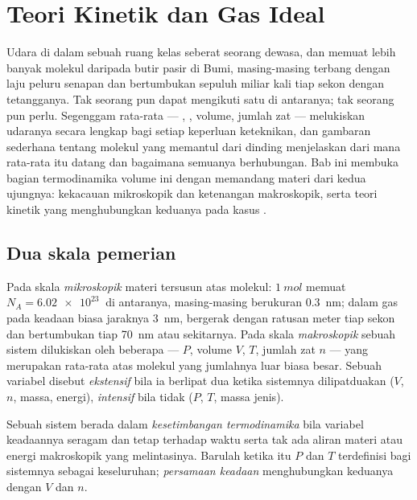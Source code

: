 \chapter{Teori Kinetik dan Gas Ideal}\label{ch:b1:kinetic-theory}

Udara di dalam sebuah ruang kelas seberat seorang dewasa, dan memuat lebih
banyak molekul daripada butir pasir di Bumi, masing-masing terbang dengan
laju peluru senapan dan bertumbukan sepuluh miliar kali tiap sekon dengan
tetangganya. Tak seorang pun dapat mengikuti satu di antaranya; tak seorang
pun perlu. Segenggam rata-rata --- , , volume, jumlah zat ---
melukiskan udaranya secara lengkap bagi setiap keperluan keteknikan, dan
gambaran sederhana tentang molekul yang memantul dari dinding menjelaskan
dari mana rata-rata itu datang dan bagaimana semuanya berhubungan. Bab ini
membuka bagian termodinamika volume ini dengan memandang materi dari kedua
ujungnya: kekacauan mikroskopik dan ketenangan makroskopik, serta teori
kinetik yang menghubungkan keduanya pada kasus .

\section{Dua skala pemerian}

\begin{definition}\label{def:b1:kinetic-theory:scales}
Pada skala \emph{mikroskopik} materi tersusun atas molekul: $\qty{1}{mol}$
memuat $N_A = \qty{6.02e23}{}$ di antaranya, masing-masing berukuran \qty{0.3}{nm};
dalam gas pada keadaan biasa jaraknya \qty{3}{nm}, bergerak dengan
ratusan meter tiap sekon dan bertumbukan tiap \qty{70}{nm} atau sekitarnya.
Pada skala \emph{makroskopik} sebuah sistem dilukiskan oleh beberapa
\emph{} ---  $P$, volume $V$,  $T$,
jumlah zat $n$ --- yang merupakan rata-rata atas molekul yang jumlahnya
luar biasa besar. Sebuah variabel disebut \emph{ekstensif} bila ia berlipat dua ketika sistemnya
dilipatduakan ($V$, $n$, massa, energi), \emph{intensif} bila tidak
($P$, $T$, massa jenis).
\end{definition}

\begin{definition}\label{def:b1:kinetic-theory:equilibrium}
Sebuah sistem berada dalam \emph{kesetimbangan termodinamika} bila variabel keadaannya
seragam dan tetap terhadap waktu serta tak ada aliran materi atau
energi makroskopik yang melintasinya. Barulah ketika itu $P$ dan $T$ terdefinisi bagi sistemnya
sebagai keseluruhan; \emph{persamaan keadaan} menghubungkan keduanya dengan $V$ dan $n$.
\end{definition}

